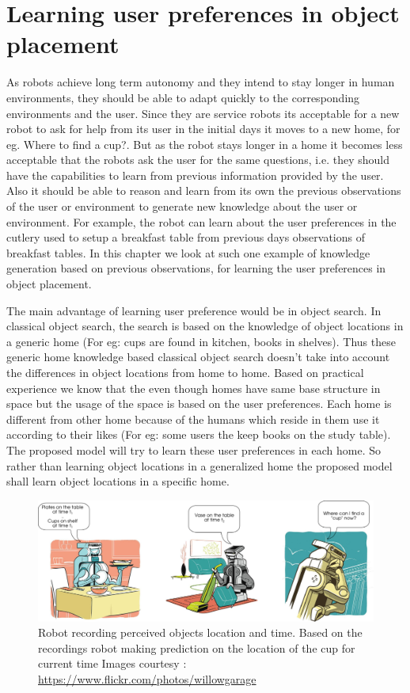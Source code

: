 \chapter{Learning user preferences in object placement}


As robots achieve long term autonomy and they intend to stay longer in human environments, they should be able to adapt quickly to the corresponding environments and the user. Since they are service robots its acceptable for a new robot to ask for help from its user in the initial days it moves to a new home, for eg. Where to find a cup?. But as the robot stays longer in a home it becomes less acceptable that the robots ask the user for the same questions, i.e. they should have the capabilities to learn from previous information provided by the user. Also it should be able to reason and learn from its own the previous observations of the user or environment to generate new knowledge about the user or environment. For example, the robot can learn about the user preferences in the cutlery used to setup a breakfast table from previous days observations of breakfast tables. In this chapter we look at such one example of knowledge generation based on previous observations, for learning the user preferences in object placement.

The main advantage of learning user preference would be in object search. In classical object search, the search is based on the knowledge of object locations in a generic home (For eg: cups are found in kitchen, books in shelves). Thus these generic home knowledge based classical object search doesn't take into account the differences in object locations from home to home. Based on practical experience we know that the even though homes have same base structure in space but the usage of the space is based on the user preferences. Each home is different from other home because of the humans which reside in them use it according to their likes (For eg: some users the keep books on the study table). The proposed model will try to learn these user preferences in each home. So rather than learning object locations in a generalized home the proposed model shall learn object locations in a specific home.


\begin{figure}[htp]
\centering
\includegraphics[scale=0.4]{pictures/scenario.png}
\caption{Robot recording perceived objects location and time. Based on the
recordings robot making prediction on the location of the cup for current time
Images courtesy : \url{https://www.flickr.com/photos/willowgarage} }
\label{scenario}
\end{figure}

